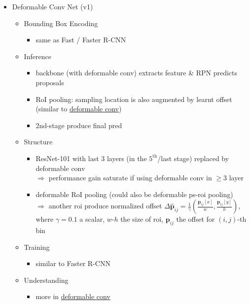 \begin{itemize}
\item Deformable Conv Net (v1)
	\begin{itemize}
	\item Bounding Box Encoding
		\begin{itemize}
		\item same as Fast / Faster R-CNN
		\end{itemize}
	\item Inference
		\begin{itemize}
		\item backbone (with deformable conv) extracts feature \& RPN predicts proposals
		\item RoI pooling: sampling location is also augmented by learnt offset \\ 
		(similar to \hyperref[DL_Layers_DeformableConv]{deformable conv})
		\item 2nd-stage produce final pred
		\end{itemize}
	\item Structure
		\begin{itemize}
		\item ResNet-101 with last 3 layers (in the $5^\text{th}$/last stage) replaced by deformable conv \\
		$\Rightarrow$ performance gain saturate if using deformable conv in $\ge3$ layer
		\item deformable RoI pooling (could also be deformable ps-roi pooling) \\
		$\Rightarrow$ another roi produce normalized offset $\Delta \hat{\mathbf p}_{ij}=\frac 1 \gamma (\frac{\mathbf p_{ij}[x]}{w}, \frac{\mathbf p_{ij}[y]}{h})$, \\
		where $\gamma=0.1$ a scalar, $w$-$h$ the size of roi, $\mathbf p_{ij}$ the offset for $(i,j)$-th bin
		\end{itemize}
	\item Training
		\begin{itemize}
		\item similar to Faster R-CNN
		\end{itemize}
	\item Understanding
		\begin{itemize}
		\item more in \hyperref[DL_Layers_DeformableConv]{deformable conv}
		\end{itemize}
	\end{itemize}
\end{itemize}

